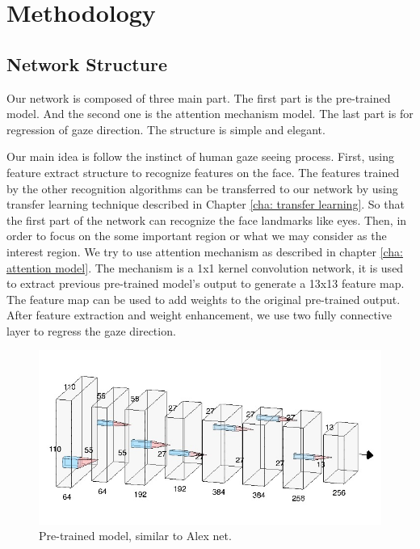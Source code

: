 \documentclass[senior]{IPSstyle}
\begin{document}
\chapter{Methodology} \label{methodology}
\section{Network Structure} \label{network structure}
Our network is composed of three main part.
The first part is the pre-trained model.
And the second one is the attention mechanism model.
The last part is for regression of gaze direction.
The structure is simple and elegant.

Our main idea is follow the instinct of human gaze seeing process.
First, using feature extract structure to recognize features on the face.
The features trained by the other recognition algorithms can be transferred to our network by using transfer learning technique described in Chapter \ref{cha: transfer learning}.
So that the first part of the network can recognize the face landmarks like eyes.
Then, in order to focus on the some important region or what we may consider as the interest region.
We try to use attention mechanism as described in chapter \ref{cha: attention model}.
The mechanism is a 1x1 kernel convolution network, it is used to extract previous pre-trained model's output to generate a 13x13 feature map.
The feature map can be used to add weights to the original pre-trained output.
After feature extraction and weight enhancement, we use two fully connective layer to regress the gaze direction.

\begin{figure}[b]
    \centering
    \includegraphics[width=15cm]{MasterThesis-master/images/pre_trained.jpg}
    \caption{Pre-trained model, similar to Alex net.}
    \label{fig:pre_trained_model}
\end{figure}
\end{document}
